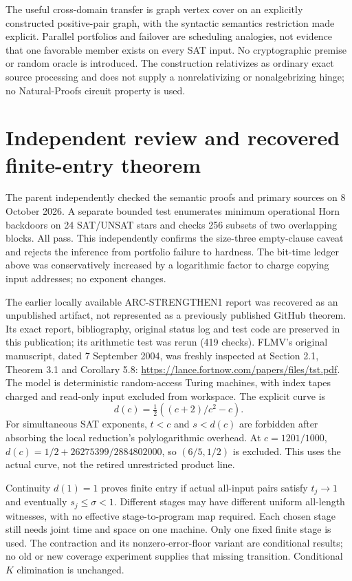 \documentclass[11pt]{article}
\begin{document}
The useful cross-domain transfer is graph vertex cover on an explicitly constructed positive-pair graph, with the syntactic semantics restriction made explicit. Parallel portfolios and failover are scheduling analogies, not evidence that one favorable member exists on every SAT input. No cryptographic premise or random oracle is introduced. The construction relativizes as ordinary exact source processing and does not supply a nonrelativizing or nonalgebrizing hinge; no Natural-Proofs circuit property is used.


\section{Independent review and recovered finite-entry theorem}
The parent independently checked the semantic proofs and primary sources on 8 October 2026. A separate bounded test enumerates minimum operational Horn backdoors on 24 SAT/UNSAT stars and checks 256 subsets of two overlapping blocks. All pass. This independently confirms the size-three empty-clause caveat and rejects the inference from portfolio failure to hardness. The bit-time ledger above was conservatively increased by a logarithmic factor to charge copying input addresses; no exponent changes.

The earlier locally available ARC-STRENGTHEN1 report was recovered as an unpublished artifact, not represented as a previously published GitHub theorem. Its exact report, bibliography, original status log and test code are preserved in this publication; its arithmetic test was rerun (419 checks). FLMV's original manuscript, dated 7 September 2004, was freshly inspected at Section 2.1, Theorem 3.1 and Corollary 5.8:
\url{https://lance.fortnow.com/papers/files/tst.pdf}.
The model is deterministic random-access Turing machines, with index tapes charged and read-only input excluded from workspace. The explicit curve is
\[
 d(c)=\tfrac12((c+2)/c^2-c).
\]
For simultaneous SAT exponents, $t<c$ and $s<d(c)$ are forbidden after absorbing the local reduction's polylogarithmic overhead. At $c=1201/1000$, $d(c)=1/2+26275399/2884802000$, so $(6/5,1/2)$ is excluded. This uses the actual curve, not the retired unrestricted product line.

Continuity $d(1)=1$ proves finite entry if actual all-input pairs satisfy $t_j\to1$ and eventually $s_j\le\sigma<1$. Different stages may have different uniform all-length witnesses, with no effective stage-to-program map required. Each chosen stage still needs joint time and space on one machine. Only one fixed finite stage is used. The contraction and its nonzero-error-floor variant are conditional results; no old or new coverage experiment supplies that missing transition. Conditional $K$ elimination is unchanged.
\end{document}
